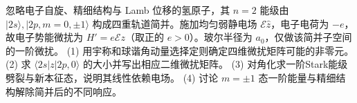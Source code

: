 忽略电子自旋、精细结构与 Lamb 位移的氢原子，其 \(n=2\) 能级由 \(|2s\rangle,|2p,m=0,\pm1\rangle\) 构成四重轨道简并。施加均匀弱静电场 \(\mathcal E\hat z\)，电子电荷为 \(-e\)，故电子势能微扰为 \(H'=e\mathcal Ez\)（取正的 \(e>0\)）。玻尔半径为 \(a_0\)，仅做该简并子空间的一阶微扰。
(1) 用宇称和球谐角动量选择定则确定四维微扰矩阵可能的非零元。
(2) 求 \(\langle2s|z|2p,0\rangle\) 的大小并写出相应二维微扰矩阵。
(3) 对角化求一阶Stark能级劈裂与新本征态，说明其线性依赖电场。
(4) 讨论 \(m=\pm1\) 态一阶能量与精细结构解除简并后的不同响应。
